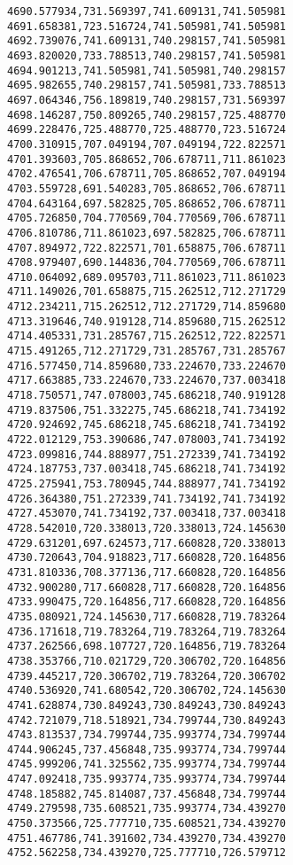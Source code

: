 \documentclass[11pt]{article}
\begin{document}
\begin{Verbatim}[commandchars=\\\{\}]
4690.577934,731.569397,741.609131,741.505981
4691.658381,723.516724,741.505981,741.505981
4692.739076,741.609131,740.298157,741.505981
4693.820020,733.788513,740.298157,741.505981
4694.901213,741.505981,741.505981,740.298157
4695.982655,740.298157,741.505981,733.788513
4697.064346,756.189819,740.298157,731.569397
4698.146287,750.809265,740.298157,725.488770
4699.228476,725.488770,725.488770,723.516724
4700.310915,707.049194,707.049194,722.822571
4701.393603,705.868652,706.678711,711.861023
4702.476541,706.678711,705.868652,707.049194
4703.559728,691.540283,705.868652,706.678711
4704.643164,697.582825,705.868652,706.678711
4705.726850,704.770569,704.770569,706.678711
4706.810786,711.861023,697.582825,706.678711
4707.894972,722.822571,701.658875,706.678711
4708.979407,690.144836,704.770569,706.678711
4710.064092,689.095703,711.861023,711.861023
4711.149026,701.658875,715.262512,712.271729
4712.234211,715.262512,712.271729,714.859680
4713.319646,740.919128,714.859680,715.262512
4714.405331,731.285767,715.262512,722.822571
4715.491265,712.271729,731.285767,731.285767
4716.577450,714.859680,733.224670,733.224670
4717.663885,733.224670,733.224670,737.003418
4718.750571,747.078003,745.686218,740.919128
4719.837506,751.332275,745.686218,741.734192
4720.924692,745.686218,745.686218,741.734192
4722.012129,753.390686,747.078003,741.734192
4723.099816,744.888977,751.272339,741.734192
4724.187753,737.003418,745.686218,741.734192
4725.275941,753.780945,744.888977,741.734192
4726.364380,751.272339,741.734192,741.734192
4727.453070,741.734192,737.003418,737.003418
4728.542010,720.338013,720.338013,724.145630
4729.631201,697.624573,717.660828,720.338013
4730.720643,704.918823,717.660828,720.164856
4731.810336,708.377136,717.660828,720.164856
4732.900280,717.660828,717.660828,720.164856
4733.990475,720.164856,717.660828,720.164856
4735.080921,724.145630,717.660828,719.783264
4736.171618,719.783264,719.783264,719.783264
4737.262566,698.107727,720.164856,719.783264
4738.353766,710.021729,720.306702,720.164856
4739.445217,720.306702,719.783264,720.306702
4740.536920,741.680542,720.306702,724.145630
4741.628874,730.849243,730.849243,730.849243
4742.721079,718.518921,734.799744,730.849243
4743.813537,734.799744,735.993774,734.799744
4744.906245,737.456848,735.993774,734.799744
4745.999206,741.325562,735.993774,734.799744
4747.092418,735.993774,735.993774,734.799744
4748.185882,745.814087,737.456848,734.799744
4749.279598,735.608521,735.993774,734.439270
4750.373566,725.777710,735.608521,734.439270
4751.467786,741.391602,734.439270,734.439270
4752.562258,734.439270,725.777710,726.579712

\end{Verbatim}
\end{document}
